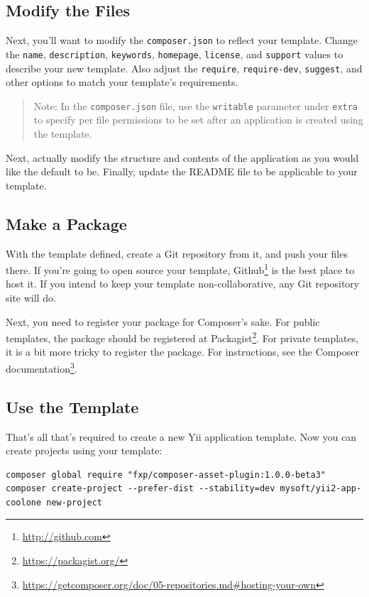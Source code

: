 \subsection{Modify the Files}
Next, you'll want to modify the \lstinline|composer.json| to reflect your template. Change the \lstinline|name|, \lstinline|description|, \lstinline|keywords|, \lstinline|homepage|, \lstinline|license|, and \lstinline|support| values
to describe your new template. Also adjust the \lstinline|require|, \lstinline|require-dev|, \lstinline|suggest|, and other options to match your template's requirements.

\begin{quote}Note: In the \lstinline|composer.json| file, use the \lstinline|writable| parameter under \lstinline|extra| to specify
per file permissions to be set after an application is created using the template.

\end{quote}
Next, actually modify the structure and contents of the application as you would like the default to be. Finally, update the README file to be applicable to your template.

\subsection{Make a Package}
With the template defined, create a Git repository from it, and push your files there. If you're going to open source your template, Github\footnote{\url{http://github.com}} is the best place to host it. If you intend to keep your template non-collaborative, any Git repository site will do.

Next, you need to register your package for Composer's sake. For public templates, the package should be registered at Packagist\footnote{\url{https://packagist.org/}}.
For private templates, it is a bit more tricky to register the package. For instructions, see the Composer documentation\footnote{\url{https://getcomposer.org/doc/05-repositories.md\#hosting-your-own}}.

\subsection{Use the Template}
That's all that's required to create a new Yii application template. Now you can create projects using your template:

\begin{lstlisting}
composer global require "fxp/composer-asset-plugin:1.0.0-beta3"
composer create-project --prefer-dist --stability=dev mysoft/yii2-app-coolone new-project
\end{lstlisting}


